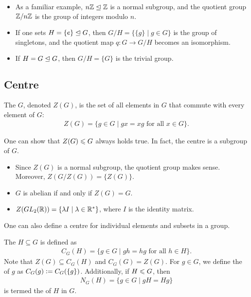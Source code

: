 \begin{example}
    \begin{itemize}
        \item As a familiar example, $n\mathbb{Z} \trianglelefteq \mathbb{Z}$ is a normal subgroup, and the quotient group $\mathbb{Z}/n\mathbb{Z}$ is the group of integers modulo $n$.
        \item If one sets $H = \{e\} \trianglelefteq G$, then $G/H = \{\{g\} \mid g \in G\}$ is the group of singletons, and the quotient map $q:G \to G/H$ becomes an isomorphism.
        \item If $H = G \trianglelefteq G$, then $G/H = \{G\}$ is the trivial group.
    \end{itemize}
\end{example}

\subsection{Centre}

\begin{definition}
    The  $G$, denoted $Z(G)$, is the set of all elements in $G$ that commute with every element of $G$:
    \begin{align}
        Z(G) = \{ g \in G \mid gx = xg \text{ for all } x \in G \}.
    \end{align}
\end{definition}

One can show that $Z(G) \leqslant G$ always holds true. In fact, the centre is a subgroup of $G$.

\begin{example}
    \begin{itemize}
        \item Since $Z(G)$ is a normal subgroup, the quotient group makes sense. Moreover, $Z(G/Z(G)) = \{Z(G)\}$.
        \item $G$ is abelian if and only if $Z(G) = G$.
        \item $Z(GL_{2}(\mathbb{R})) = \{\lambda I \mid \lambda \in \mathbb{R}^{\ast}\}$, where $I$ is the identity matrix.
    \end{itemize}
\end{example}

One can also define a centre for individual elements and subsets in a group.

\begin{definition}
    The  $H \subseteq G$ is defined as
    \begin{align}
        C_{G}(H) = \{g \in G \mid gh = hg \text{ for all } h \in H\}.
    \end{align}
    Note that $Z(G) \subseteq C_{G}(H)$ and $C_{G}(G) = Z(G)$. For $g \in G$, we define the  of $g$ as $C_{G}(g) \vcentcolon= C_{G}(\{g\})$. Additionally, if $H \leqslant G$, then
    \begin{align}
        N_{G}(H) = \{g \in G \mid gH = Hg\}
    \end{align}
    is termed the  of $H$ in $G$.
\end{definition}

